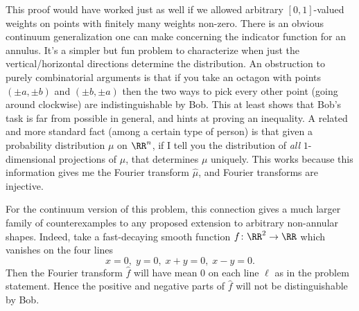 \documentclass[11pt]{scrartcl}
\begin{document}
\begin{remark*}
  \begin{itemize}
  \ii This proof would have worked just as well if we
  allowed arbitrary $[0,1]$-valued weights on points
  with finitely many weights non-zero.
  There is an obvious continuum generalization one
  can make concerning the indicator function for an annulus.
  It's a simpler but fun problem to characterize
  when just the vertical/horizontal directions determine the distribution.
  \ii An obstruction to purely combinatorial arguments
  is that if you take an octagon with points $(\pm a,\pm b)$
  and $(\pm b,\pm a)$ then the two ways to pick every other point
  (going around clockwise) are indistinguishable by Bob.
  This at least shows that Bob's task is far from possible in general,
  and hints at proving an inequality.
  \ii A related and more standard fact
  (among a certain type of person)
  is that given a probability distribution $\mu$ on $\RR^n$,
  if I tell you the distribution of \emph{all} $1$-dimensional
  projections of $\mu$, that determines $\mu$ uniquely.
  This works because this information gives me the Fourier transform $\hat{\mu}$,
  and Fourier transforms are injective.

  For the continuum version of this problem,
  this connection gives a much larger family of counterexamples
  to any proposed extension to arbitrary non-annular shapes.
  Indeed, take a fast-decaying smooth function
  $f \colon \RR^2 \to \RR$ which vanishes on the four lines
  \[ x=0, \; y=0, \; x+y=0, \; x-y=0.\]
  Then the Fourier transform $\hat f$ will have mean $0$
  on each line $\ell$ as in the problem statement.
  Hence the positive and negative parts of $\hat f$
  will not be distinguishable by Bob.
  \end{itemize}
\end{remark*}
\pagebreak
\end{document}
